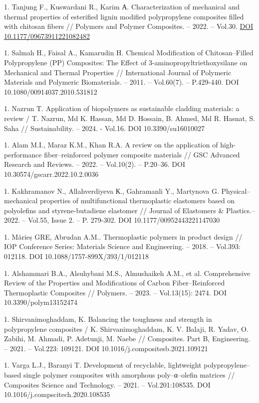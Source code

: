 1. Tanjung F., Kuswardani R., Karim А. Characterization of mechanical and
thermal properties of esterified lignin modified polypropylene
composites filled with chitosan fibers // Polymers and Polymer
Composites. -- 2022. -- Vol.30.
\href{https://doi.org/10.1177/09673911221082482}{DOI
10.1177/09673911221082482}

1. Salmah H., Faisal A., Kamarudin H. Chemical Modification of
Chitosan--Filled Polypropylene (PP) Composites: The Effect of
3-aminopropyltriethoxysilane on Mechanical and Thermal Properties //
International Journal of Polymeric Materials and Polymeric
Biomaterials. -- 2011. -- Vol.60(7). -- P.429-440. DOI
10.1080/00914037.2010.531812

1. Nazrun T. Application of biopolymers as sustainable cladding
materials: a review / T. Nazrun, Md K. Hassan, Md D. Hossain, B.
Ahmed, Md R. Hasnat, S. Saha // Sustainability. -- 2024. - Vol.16.
DOI 10.3390/su16010027

1. Alam M.I., Maraz K.M., Khan R.A. A review on the application of
high-performance fiber--reinforced polymer composite materials // GSC
Advanced Research and Reviews. -- 2022. -- Vol.10(2). -- P.20--36.
DOI 10.30574/gscarr.2022.10.2.0036

1. Kakhramanov N., Allahverdiyeva К., Gahramanli Y., Martynova G.
Physical--mechanical properties of multifunctional thermoplastic
elastomers based on polyolefins and styrene-butadiene elastomer //
Journal of Elastomers \& Plastics.-- 2022. -- Vol.55, Issue 2. -- P.
279-302. DOI 10.1177/00952443221147030

1. Mărieș GRE, Abrudan A.M.. Thermoplastic polymers in product design //
IOP Conference Series: Materials Science and Engineering. -- 2018. --
Vol.393: 012118. DOI 10.1088/1757-899X/393/1/012118

1. Alshammari B.A., Alsuhybani M.S., Almushaikeh A.M., et al.
Comprehensive Review of the Properties and Modifications of Carbon
Fiber--Reinforced Thermoplastic Composites // Polymers. -- 2023. --
Vol.13(15): 2474. DOI 10.3390/polym13152474

1. Shirvanimoghaddam, K. Balancing the toughness and strength in
polypropylene composites / K. Shirvanimoghaddam, K. V. Balaji, R.
Yadav, O. Zabihi, M. Ahmadi, P. Adetunji, M. Naebe // Composites. Part
B, Engineering. -- 2021. -- Vol.223: 109121. DOI
10.1016/j.compositesb.2021.109121

1. Varga L.J., Baranyi T. Development of recyclable, lightweight
polypropylene--based single polymer composites with amorphous
poly--α--olefin matrices // Composites Science and Technology. --
2021. -- Vol.201:108535. DOI 10.1016/j.compscitech.2020.108535


